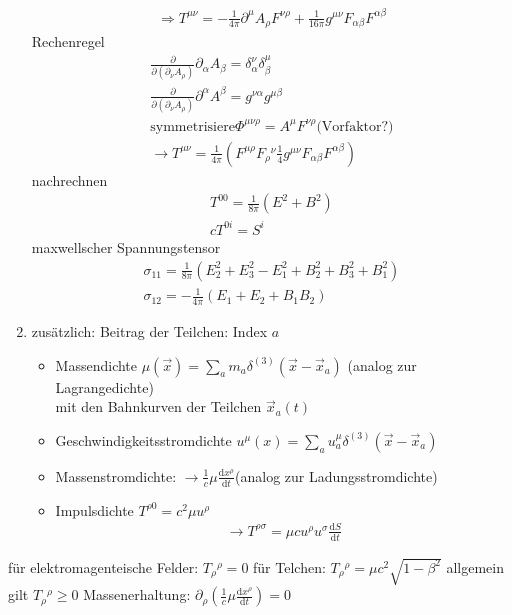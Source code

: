 \documentclass[a4paper]{article}
\begin{document}
\begin{enumerate}
\begin{align}
  \Rightarrow T^{\mu\nu}=-\frac{1}{4\pi}\partial^\mu A_\rho
  F^{\nu\rho}+\frac{1}{16\pi} g^{\mu\nu} F_{\alpha\beta}F^{\alpha\beta}
  \end{align}
  Rechenregel \begin{align}
  \frac{\partial}{\partial(\partial_\nu A_\rho)}\partial_\alpha A_\beta
  =\delta^\nu_\alpha\delta^\mu_\beta\\
  \frac{\partial}{\partial(\partial_\nu A_\rho)}\partial^\alpha A^\beta
  =g^{\nu\alpha}g^{\mu\beta}\\
  \text{symmetrisiere} \Phi^{\mu\nu\rho}=A^\mu F^{\nu\rho} \text{
  (Vorfaktor?)}\\
  \rightarrow T^{\mu\nu}=\frac{1}{4\pi}\left(
  F^{\mu\rho}F_{\rho}{}^{\nu} \frac{1}{4} g^{\mu\nu}
  F_{\alpha\beta}F^{\alpha\beta}\right)
  \end{align}
  nachrechnen
  \begin{align}
  T^{00}=\frac{1}{8\pi}(E^2+B^2)\\
  cT^{0i}=S^i
  \end{align}
  maxwellscher Spannungstensor
  \begin{align}
  \sigma_{11}=\frac{1}{8\pi}\left( E_2^2+E_3^2-E_1^2+B^2_2+B^2_3+B^2_1 \right)\\
  \sigma_{12}=-\frac{1}{4\pi}\left( E_1+E_2+B_1B_2 \right)
  \end{align}
  \item zusätzlich: Beitrag der Teilchen: Index $a$\\
  \begin{itemize}
  \item Massendichte $\mu(\vec{x})=\sum_am_a\delta^{(3)}(\vec{x}-\vec{x}_a)$
  	(analog zur Lagrangedichte)\\
  	mit den Bahnkurven der Teilchen $\vec{x}_a(t)$\\
  \item Geschwindigkeitsstromdichte 
  	$u^\mu(x)=\sum_a u^\mu_a \delta^{(3)}(\vec{x}-\vec{x}_a)$
  \item Massenstromdichte: $\rightarrow \frac{1}{c}\mu\frac{\mathrm{d}x^\rho}{\mathrm{d}t}$(analog zur
  	Ladungsstromdichte)\\
  \item Impulsdichte $T^{\rho0}=c^2\mu u^\rho$\\ \begin{align}
  	\rightarrow T^{\rho\sigma}=\mu c u^\rho u^\sigma \frac{\mathrm{d}S}{\mathrm{d}t}
  	\end{align} 
  \end{itemize}
\end{enumerate}
für elektromagenteische Felder: $T_\rho{}^\rho=0$
für Telchen: $T_\rho{}^\rho=\mu c^2\sqrt{1-\beta^2}$
allgemein gilt $T_\rho{}^\rho\geq0$
Massenerhaltung: $\partial_\rho\left( \frac{1}{c}\mu \frac{\mathrm{d}x^\rho}{\mathrm{d}t}
\right)=0$
\end{document}

